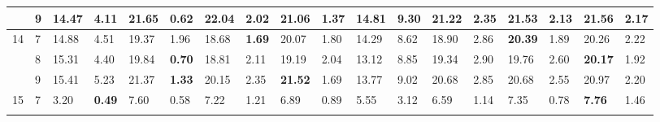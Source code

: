 \documentclass[conference]{IEEEtran}
\begin{document}
\begin{table}[]
\begin{tabular}{|cl|ll|ll|ll|ll|ll|ll|ll|ll|}
		\multicolumn{1}{|c|}{}                    & 9          & \multicolumn{1}{l|}{14.47}         & 4.11          & \multicolumn{1}{l|}{21.65}          & \textbf{0.62} & \multicolumn{1}{l|}{\textbf{22.04}} & 2.02          & \multicolumn{1}{l|}{21.06}          & 1.37          & \multicolumn{1}{l|}{14.81}                & 9.30  & \multicolumn{1}{l|}{21.22} & 2.35 & \multicolumn{1}{l|}{21.53}          & 2.13          & \multicolumn{1}{l|}{21.56}          & 2.17          \\ \hline
		\multicolumn{1}{|c|}{\multirow{3}{*}{14}} & 7          & \multicolumn{1}{l|}{14.88}         & 4.51          & \multicolumn{1}{l|}{19.37}          & 1.96          & \multicolumn{1}{l|}{18.68}          & \textbf{1.69} & \multicolumn{1}{l|}{20.07}          & 1.80          & \multicolumn{1}{l|}{14.29}                & 8.62  & \multicolumn{1}{l|}{18.90} & 2.86 & \multicolumn{1}{l|}{\textbf{20.39}} & 1.89          & \multicolumn{1}{l|}{20.26}          & 2.22          \\ \cline{2-18} 
		\multicolumn{1}{|c|}{}                    & 8          & \multicolumn{1}{l|}{15.31}         & 4.40          & \multicolumn{1}{l|}{19.84}          & \textbf{0.70} & \multicolumn{1}{l|}{18.81}          & 2.11          & \multicolumn{1}{l|}{19.19}          & 2.04          & \multicolumn{1}{l|}{13.12}                & 8.85  & \multicolumn{1}{l|}{19.34} & 2.90 & \multicolumn{1}{l|}{19.76}          & 2.60          & \multicolumn{1}{l|}{\textbf{20.17}} & 1.92          \\ \cline{2-18} 
		\multicolumn{1}{|c|}{}                    & 9          & \multicolumn{1}{l|}{15.41}         & 5.23          & \multicolumn{1}{l|}{21.37}          & \textbf{1.33} & \multicolumn{1}{l|}{20.15}          & 2.35          & \multicolumn{1}{l|}{\textbf{21.52}} & 1.69          & \multicolumn{1}{l|}{13.77}                & 9.02  & \multicolumn{1}{l|}{20.68} & 2.85 & \multicolumn{1}{l|}{20.68}          & 2.55          & \multicolumn{1}{l|}{20.97}          & 2.20          \\ \hline
		\multicolumn{1}{|c|}{\multirow{3}{*}{15}} & 7          & \multicolumn{1}{l|}{3.20}          & \textbf{0.49} & \multicolumn{1}{l|}{7.60}           & 0.58          & \multicolumn{1}{l|}{7.22}           & 1.21          & \multicolumn{1}{l|}{6.89}           & 0.89          & \multicolumn{1}{l|}{5.55}                 & 3.12  & \multicolumn{1}{l|}{6.59}  & 1.14 & \multicolumn{1}{l|}{7.35}           & 0.78          & \multicolumn{1}{l|}{\textbf{7.76}}  & 1.46          \\ \cline{2-18} 

\end{tabular}
\end{table}
\end{document}
